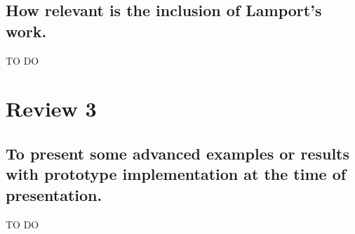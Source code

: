 \documentclass{IOS-Book-Article}
\begin{document}
\subsection{How relevant is the inclusion of Lamport's work.} 
{\red TO DO}

\section{Review 3}
\subsection{To present some advanced examples or results with
  prototype implementation at the time of presentation.} 
{\red TO DO}



\end{document}
